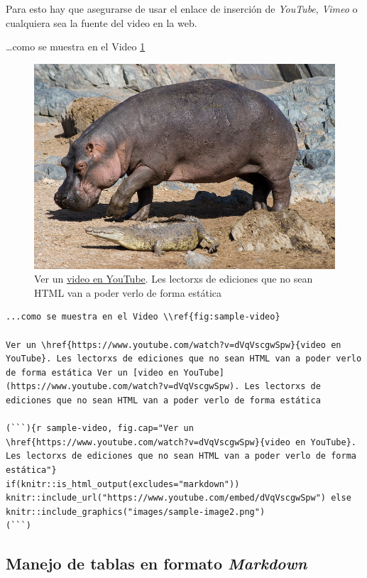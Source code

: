 \documentclass[
]{book}
\begin{document}
Para esto hay que asegurarse de usar el enlace de inserción de \emph{YouTube}, \emph{Vimeo} o cualquiera sea la fuente del video en la web.

\ldots como se muestra en el Video \ref{fig:sample-video}



\begin{figure}
\centering
\includegraphics{images/sample-image2.png}
\caption{\label{fig:sample-video}Ver un \href{https://www.youtube.com/watch?v=dVqVscgwSpw}{video en YouTube}. Les lectorxs de ediciones que no sean HTML van a poder verlo de forma estática}
\end{figure}

\begin{verbatim}
...como se muestra en el Video \\ref{fig:sample-video}

Ver un \href{https://www.youtube.com/watch?v=dVqVscgwSpw}{video en YouTube}. Les lectorxs de ediciones que no sean HTML van a poder verlo de forma estática Ver un [video en YouTube](https://www.youtube.com/watch?v=dVqVscgwSpw). Les lectorxs de ediciones que no sean HTML van a poder verlo de forma estática

(```){r sample-video, fig.cap="Ver un \href{https://www.youtube.com/watch?v=dVqVscgwSpw}{video en YouTube}. Les lectorxs de ediciones que no sean HTML van a poder verlo de forma estática"}
if(knitr::is_html_output(excludes="markdown")) knitr::include_url("https://www.youtube.com/embed/dVqVscgwSpw") else knitr::include_graphics("images/sample-image2.png")
(```)
\end{verbatim}

\hypertarget{manejo-de-tablas-en-formato-markdown}{%
\subsection{\texorpdfstring{Manejo de tablas en formato \emph{Markdown}}{Manejo de tablas en formato Markdown}}\label{manejo-de-tablas-en-formato-markdown}}
\end{document}
